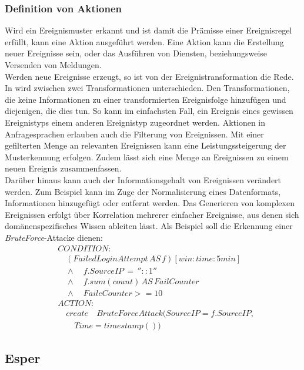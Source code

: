 \documentclass{acm_proc_article-sp}
\begin{document}
\subsubsection{Definition von Aktionen}
\vspace{0.1cm}
Wird ein Ereignismuster erkannt und ist damit die Prämisse einer Ereignisregel erfüllt, 
kann eine Aktion ausgeführt werden. Eine Aktion kann die Erstellung neuer Ereignisse 
sein, oder das Ausführen von Diensten, beziehungsweise Versenden von Meldungen.\\
Werden neue Ereignisse erzeugt, so ist von der Ereignistransformation die Rede. In 
\cite{bruns} wird zwischen zwei Transformationen unterschieden. Den Transformationen, die 
keine Informationen zu einer transformierten Ereignisfolge hinzufügen und diejenigen, die 
dies tun. So kann im einfachsten Fall, ein Ereignis eines gewissen Ereignistyps einem 
anderen Ereignistyp zugeordnet werden. Aktionen in Anfragesprachen erlauben auch die 
Filterung von Ereignissen. Mit einer gefilterten Menge an relevanten Ereignissen kann 
eine Leistungssteigerung der Musterkennung erfolgen. Zudem lässt sich eine Menge an 
Ereignissen zu einem neuen Ereignis zusammenfassen.\\
Darüber hinaus kann auch der Informationsgehalt von Ereignissen verändert werden. Zum 
Beispiel kann im Zuge der Normalisierung eines Datenformats, Informationen hinzugefügt 
oder entfernt werden. Das Generieren von komplexen Ereignissen erfolgt über Korrelation 
mehrerer 
einfacher Ereignisse, aus denen sich domänenspezifisches Wissen ableiten lässt. Als 
Beispiel soll die Erkennung einer \textit{BruteForce}-Attacke dienen:
\begin{align*}
&CONDITION:\\
&\quad (FailedLoginAttempt\, AS\, f)[win:time:5min]\\
&\quad \land\quad f.SourceIP\, =\, ''::1'' \\
&\quad \land\quad f.sum(count)\, AS\, FailCounter\\
&\quad \land\quad FaileCounter >= 10\\
&ACTION:\\
&\quad create \quad BruteForceAttack(SourceIP = f.SourceIP,\\
&\quad \quad Time=timestamp())
\end{align*}

%
%
\subsection{Esper}\label{kap:esper} 
\vspace{0.1cm}
\end{document}
